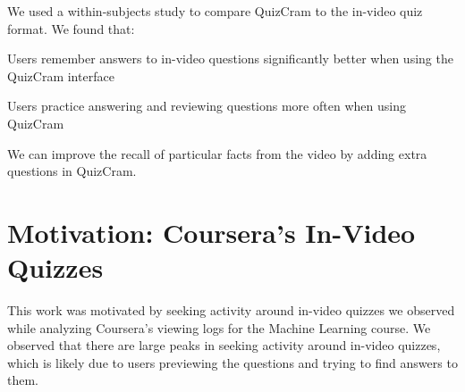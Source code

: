 \documentclass{sigchi}
\begin{document}
We used a within-subjects study to compare QuizCram to the in-video quiz format. We found that:


\begin{compactitem}
\item Users remember answers to in-video questions significantly better when using the QuizCram interface
\item Users practice answering and reviewing questions more often when using QuizCram
\item We can improve the recall of particular facts from the video by adding extra questions in QuizCram.
\end{compactitem}

\pagebreak

\section{Motivation: Coursera's In-Video Quizzes}


This work was motivated by seeking activity around in-video quizzes we observed while analyzing Coursera's viewing logs for the Machine Learning course. We observed that there are large peaks in seeking activity around in-video quizzes, which is likely due to users previewing the questions and trying to find answers to them. %

\end{document}
